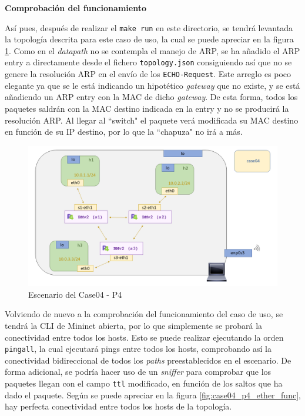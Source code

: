 \vspace{0.5cm}
\textbf{Comprobación del funcionamiento}\\
\par


Así pues, después de realizar el \texttt{make run} en este directorio, se tendrá levantada la topología descrita para este caso de uso, la cual se puede apreciar en la figura \ref{fig:case04_p4_ether_scenario}. Como en el \textit{datapath} no se contempla el manejo de ARP, se ha añadido el ARP entry a directamente desde el fichero \texttt{topology.json} consiguiendo así que no se genere la resolución ARP en el envío de los \texttt{ECHO-Request}. Este arreglo es poco elegante ya que se le está indicando un hipotético \textit{gateway} que no existe, y se está añadiendo un ARP entry con la MAC de dicho \textit{gateway}. De esta forma, todos los paquetes saldrán con la MAC destino indicada en la entry y no se producirá la resolución ARP. Al llegar al ``switch" el paquete verá modificada su MAC destino en función de su IP destino, por lo que la ``chapuza" no irá a más.\\
\par

\begin{figure}[ht]
    \centering
    \includegraphics[width=12cm]{archivos/img/dev/p4/case04/scenario.png}
    \caption{Escenario del Case04 - P4}
    \label{fig:case04_p4_ether_scenario}
\end{figure}


Volviendo de nuevo a la comprobación del funcionamiento del caso de uso, se tendrá la CLI de Mininet abierta, por lo que simplemente se probará la conectividad entre todos los hosts. Esto se puede realizar ejecutando la orden \texttt{pingall}, la cual ejecutará pings entre todos los hosts, comprobando así la conectividad bidireccional de todos los \textit{paths} preestablecidos en el escenario. De forma adicional, se podría hacer uso de un \textit{sniffer} para comprobar que los paquetes llegan con el campo \texttt{ttl} modificado, en función de los saltos que ha dado el paquete. Según se puede apreciar en la figura \ref{fig:case04_p4_ether_func}, hay perfecta conectividad entre todos los hosts de la topología.

